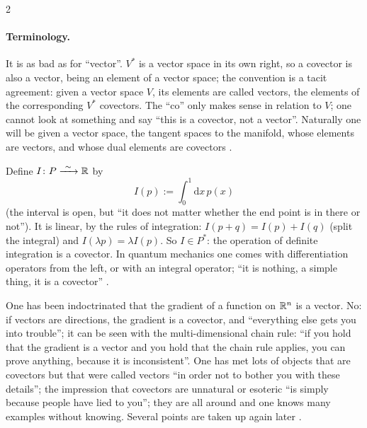 \begin{paracol}{2}
\paragraph{Terminology.} It is as bad as for ``vector''. $V^*$ is a vector space in its own right, so a covector is also a vector, being an element of a vector space; the convention is a tacit agreement: given a vector space $V$, its elements are called vectors, the elements of the
corresponding $V^*$ covectors. The ``co'' only makes sense in relation to $V$; one cannot look at something and say ``this is a covector, not a vector''. Naturally one will be given a vector space, the tangent spaces to the manifold, whose elements are vectors, and whose dual elements are covectors
.

\begin{example}\label{ex:c03-int}
Define $I\colon P\xrightarrow{\ \sim\ }\mathbb{R}$ by
\[
  I(p):=\int_0^1\mathrm dx\,p(x)
\]
(the interval is open, but ``it does not matter whether the end point is in there or not''). It is linear, by the rules of integration: $I(p+q)=I(p)+I(q)$ (split the integral) and $I(\lambda p)=\lambda I(p)$. So $I\in P^*$: the operation of definite integration is a covector.
In quantum mechanics one comes with differentiation operators from the left, or with an integral operator; ``it is nothing, a simple thing, it is a covector'' .
\end{example}
\begin{aside}
One has been indoctrinated that the gradient of a function on $\mathbb{R}^n$ is a vector. No: if vectors are directions, the gradient is a covector, and ``everything else gets you into trouble''; it can be seen with the multi-dimensional chain rule:
``if you hold that the gradient is a vector and you hold that the chain rule applies, you can prove anything, because it is inconsistent''. One has met lots of objects that are covectors but that were called vectors ``in order not to bother you with these details'';
the impression that covectors are unnatural or esoteric ``is simply because people have lied to you''; they are all around and one knows many examples without knowing. Several points are taken up again later
.
\end{aside}


\end{paracol}
